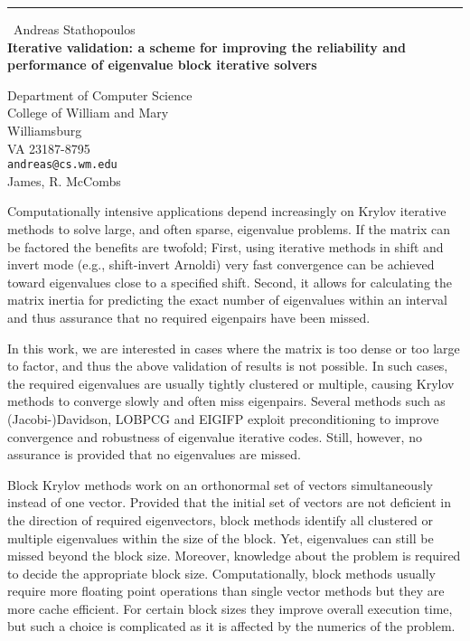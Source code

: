 \documentclass{report}
\begin{document}
\begin{center}
\rule{6in}{1pt} \
{\large Andreas Stathopoulos \\
{\bf Iterative validation: a scheme for improving the reliability and performance of eigenvalue block iterative solvers}}

Department of Computer Science  \\           College of William and Mary \\ Williamsburg \\ VA 23187-8795
\\
{\tt andreas@cs.wm.edu}\\
James, R. McCombs\end{center}

Computationally intensive applications depend increasingly on
Krylov iterative methods to solve large, and often sparse,
eigenvalue problems.
If the matrix can be factored the benefits are twofold;
First, using iterative methods in shift and invert mode
(e.g., shift-invert Arnoldi) very fast convergence can be achieved
toward eigenvalues close to a specified shift.
Second, it allows for calculating the matrix inertia
for predicting the exact number of eigenvalues within an interval
and thus assurance that no required eigenpairs have been missed.

In this work, we are interested in cases where the matrix is too dense
or too large to factor, and thus the above validation of results is
not possible.
In such cases, the required eigenvalues are usually
tightly clustered or multiple, causing Krylov methods to converge
slowly and often miss eigenpairs.
Several methods such as (Jacobi-)Davidson, LOBPCG and EIGIFP
exploit preconditioning to improve convergence and robustness of
eigenvalue iterative codes.
Still, however, no assurance is provided that no eigenvalues are missed.

Block Krylov methods work on an orthonormal set of vectors simultaneously
instead of one vector.
Provided that the initial set of vectors are not deficient in the direction
of required eigenvectors, block methods identify all clustered or
multiple eigenvalues within the size of the block.
Yet, eigenvalues can still be missed beyond the block size.
Moreover, knowledge about the problem is required to decide the
appropriate block size.
Computationally, block methods usually require more floating point
operations than single vector methods but they are more cache efficient.
For certain block sizes they improve overall execution time, but such
a choice is complicated as it is affected by the numerics of the problem.
\end{document}

